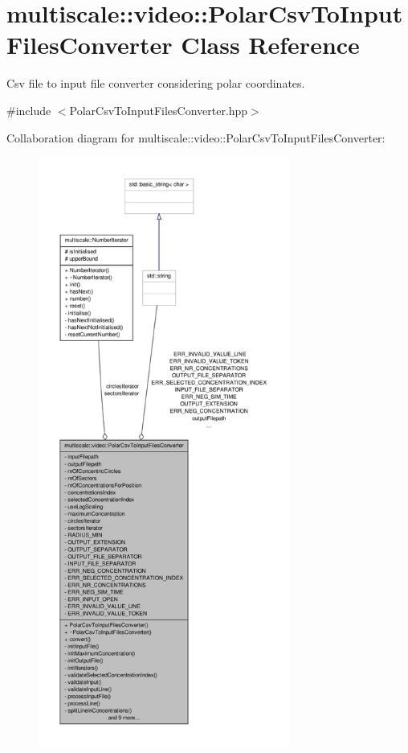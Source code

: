 \hypertarget{classmultiscale_1_1video_1_1PolarCsvToInputFilesConverter}{\section{multiscale\-:\-:video\-:\-:\-Polar\-Csv\-To\-Input\-Files\-Converter \-Class \-Reference}
\label{classmultiscale_1_1video_1_1PolarCsvToInputFilesConverter}
}


\-Csv file to input file converter considering polar coordinates.  




{\ttfamily \#include $<$\-Polar\-Csv\-To\-Input\-Files\-Converter.\-hpp$>$}



\-Collaboration diagram for multiscale\-:\-:video\-:\-:\-Polar\-Csv\-To\-Input\-Files\-Converter\-:
\nopagebreak
\begin{figure}[H]
\begin{center}
\leavevmode
\includegraphics[height=550pt]{classmultiscale_1_1video_1_1PolarCsvToInputFilesConverter__coll__graph}
\end{center}
\end{figure}
